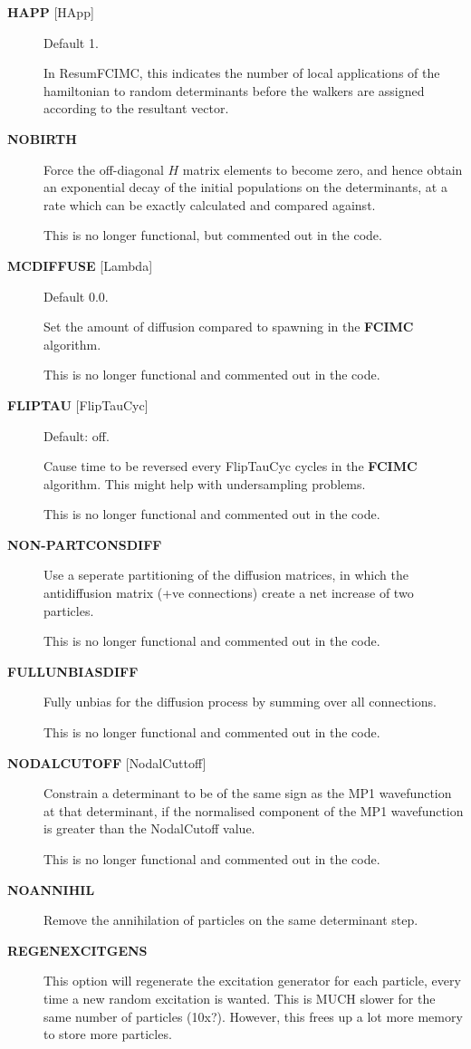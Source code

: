 \documentclass[openany,a4paper,10pt]{manual}
\begin{document}
\begin{description}
\item[\textbf{HAPP} {[}HApp{]}]
Default 1.

In ResumFCIMC, this indicates the number of local applications of the
hamiltonian to random determinants before the walkers are assigned
according to the resultant vector.

\item[\textbf{NOBIRTH}]
Force the off-diagonal $H$ matrix elements to become zero,
and hence obtain an exponential decay of the initial populations
on the determinants, at a rate which can be exactly calculated and
compared against.

This is no longer functional, but commented out in the
code.

\item[\textbf{MCDIFFUSE} {[}Lambda{]}]
Default 0.0.

Set the amount of diffusion compared to spawning in the \textbf{FCIMC}
algorithm.

This is no longer functional and commented out in the code.

\item[\textbf{FLIPTAU} {[}FlipTauCyc{]}]
Default: off.

Cause time to be reversed every FlipTauCyc cycles in the \textbf{FCIMC}
algorithm. This might help with undersampling problems.

This is no longer functional and commented out in the code.

\item[\textbf{NON-PARTCONSDIFF}]
Use a seperate partitioning of the diffusion matrices, in which
the antidiffusion matrix (+ve connections) create a net increase of
two particles.

This is no longer functional and commented out in the code.

\item[\textbf{FULLUNBIASDIFF}]
Fully unbias for the diffusion process by summing over all connections.

This is no longer functional and commented out in the code.

\item[\textbf{NODALCUTOFF} {[}NodalCuttoff{]}]
Constrain a determinant to be of the same sign as the MP1
wavefunction at that determinant, if the normalised component of
the MP1 wavefunction is greater than the NodalCutoff value.

This is no longer functional and commented out in the code.

\item[\textbf{NOANNIHIL}]
Remove the annihilation of particles on the same
determinant step.

\item[\textbf{REGENEXCITGENS}]
This option will regenerate the excitation generator for each particle, every time a
new random excitation is wanted. This is MUCH slower for the same number of particles
(10x?). However, this frees up a lot more memory to store more particles.

\end{description}
\end{document}
